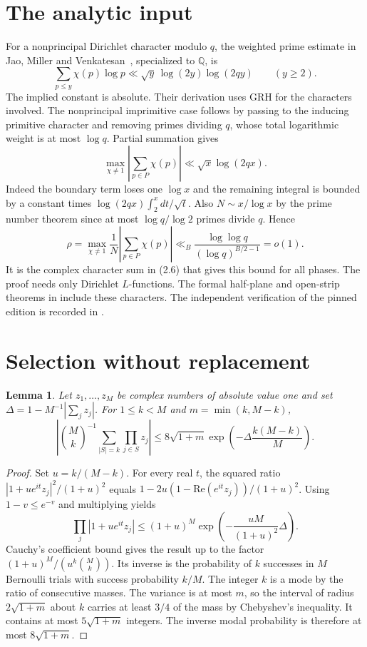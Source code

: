 \documentclass[11pt]{article}
\newtheorem{lemma}[theorem]{Lemma}
\theoremstyle{remark}\newtheorem*{remark}{Remark}
\begin{document}
\section{The analytic input}
For a nonprincipal Dirichlet character modulo $q$, the weighted prime estimate in Jao, Miller and Venkatesan~\cite[proof of Theorem 1.1, (2.6)]{jmv}, specialized to $\mathbb Q$, is
\[
 \sum_{p\le y}\chi(p)\log p\ll\sqrt y\,\log(2y)\log(2qy)\qquad(y\ge2).
\]
The implied constant is absolute. Their derivation uses GRH for the characters involved. The nonprincipal imprimitive case follows by passing to the inducing primitive character and removing primes dividing $q$, whose total logarithmic weight is at most $\log q$. Partial summation gives
\[
 \max_{\chi\ne1}\left|\sum_{p\in P}\chi(p)\right|\ll\sqrt x\log(2qx).
\]
Indeed the boundary term loses one $\log x$ and the remaining integral is bounded by a constant times $\log(2qx)\int_2^x dt/\sqrt t$. Also $N\sim x/\log x$ by the prime number theorem since at most $\log q/\log2$ primes divide $q$. Hence
\begin{equation}\label{eq:rho}
 \rho=\max_{\chi\ne1}\frac1N\left|\sum_{p\in P}\chi(p)\right|
 \ll_B\frac{\log\log q}{(\log q)^{B/2-1}}=o(1).
\end{equation}
It is the complex character sum in (2.6) that gives this bound for all phases. The proof needs only Dirichlet $L$-functions. The formal half-plane and open-strip theorems in \cite{lean} include these characters. The independent verification of the pinned edition is recorded in \cite{suth}.

\section{Selection without replacement}
\begin{lemma}\label{lem:fixed}
Let $z_1,\ldots,z_M$ be complex numbers of absolute value one and set $\Delta=1-M^{-1}|\sum_jz_j|$. For $1\le k<M$ and $m=\min(k,M-k)$,
\[
 \left|\binom Mk^{-1}\sum_{|S|=k}\prod_{j\in S}z_j\right|
 \le 8\sqrt{1+m}\exp\!\left(-\Delta\frac{k(M-k)}M\right).
\]
\end{lemma}
\begin{proof}
Set $u=k/(M-k)$. For every real $t$, the squared ratio
$|1+ue^{it}z_j|^2/(1+u)^2$ equals
$1-2u(1-\mathrm{Re}(e^{it}z_j))/(1+u)^2$. Using $1-v\le e^{-v}$ and multiplying yields
\[
 \prod_j |1+ue^{it}z_j|\le (1+u)^M
 \exp\!\left(-\frac{uM}{(1+u)^2}\Delta\right).
\]
Cauchy's coefficient bound gives the result up to the factor $(1+u)^M/(u^k\binom Mk)$. Its inverse is the probability of $k$ successes in $M$ Bernoulli trials with success probability $k/M$. The integer $k$ is a mode by the ratio of consecutive masses. The variance is at most $m$, so the interval of radius $2\sqrt{1+m}$ about $k$ carries at least $3/4$ of the mass by Chebyshev's inequality. It contains at most $5\sqrt{1+m}$ integers. The inverse modal probability is therefore at most $8\sqrt{1+m}$.
\end{proof}
\end{document}
